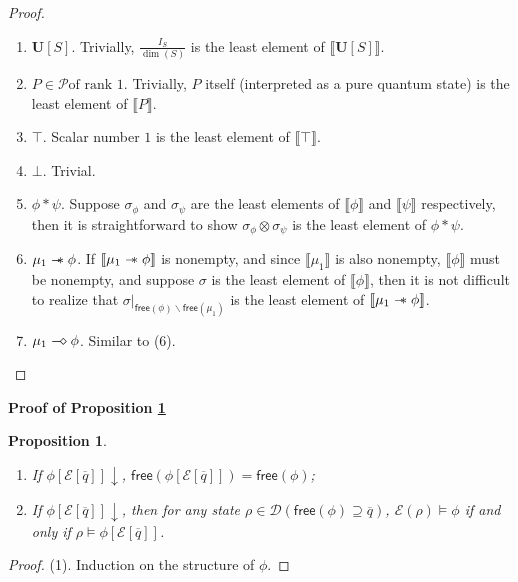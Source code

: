 \documentclass[conference,compsoc, 10pt]{IEEEtran}
\newtheorem{proposition}{Proposition}[section]
\newcommand {\qbar} {{\overline{q}}}
\newcommand {\cD } {{\mathcal{D}}}
\newcommand {\cP } {{\mathcal{P}}}
\newcommand {\cE } {{\mathcal{E}}}
\newcommand{\Mexist}{{\downarrow}}
\newcommand {\free }[1] {{\mathsf{free}\left(#1\right)}}
\newcommand {\rt }[2] {{\left.{#1}\right|_{#2}}}
\newcommand {\unia } {{\mathbf{U}}}
\newcommand {\sepimp} {\mathrel{-\mkern-6mu*}}
\newcommand {\sem}[1] {\llbracket#1\rrbracket}
\newcommand {\sdimp} {\mathrel{-\mkern-2.5mu\diamond}}
\begin{document}
\begin{appendices}
		\begin{proof}
			\begin{enumerate}
				\item $\unia[S]$. Trivially, $\frac{I_S}{\dim(S)}$ is the least element of $\sem{\unia[S]}$.
				\item $P\in\cP \text{of rank 1}$. Trivially, $P$ itself (interpreted as a pure quantum state) is the least element of $\sem{P}$.
				\item $\top$. Scalar number $1$ is the least element of $\sem{\top}$.
				\item $\bot$. Trivial.
				\item $\phi\ast\psi$. Suppose $\sigma_\phi$ and $\sigma_\psi$ are the least elements of  $\sem{\phi}$ and  $\sem{\psi}$ respectively, then it is straightforward to show $\sigma_\phi\otimes \sigma_\psi$ is the least element of $\phi\ast\psi$.
				\item $\mu_1 \sepimp \phi$. If $\sem{\mu_1 \sepimp \phi}$ is nonempty, and since $\sem{\mu_1}$ is also nonempty, $\sem{\phi}$ must be nonempty, and suppose $\sigma$ is the least element of $\sem{\phi}$, then it is not difficult to realize that $\rt{\sigma}{\free{\phi}\backslash\free{\mu_1}}$ is the least element of $\sem{\mu_1 \sepimp \phi}$.
				\item $\mu_1 \sdimp \phi$. Similar to (6).
			\end{enumerate}
		\end{proof}
		
		\vspace{0.5cm}
		
		\noindent\textbf{Proof of Proposition \ref{prop modification qo 2BID}}
		
		\begin{proposition}
			\label{prop modification qo 2BID}
			\begin{enumerate}
				\item If $\phi[\cE[\qbar]]\Mexist$, $\free{\phi[\cE[\qbar]]} = \free {\phi}$;
				\item 
				If $\phi[\cE[\qbar]]\Mexist$, then for any state $\rho\in\cD(\free{\phi}\supseteq\qbar)$, $\cE(\rho)\models\phi$ if and only if $\rho\models \phi[\cE[\qbar]]$.
			\end{enumerate}
		\end{proposition}
		\begin{proof}
			\noindent	(1). Induction on the structure of $\phi$.
			

\end{proof}
\end{appendices}
\end{document}
